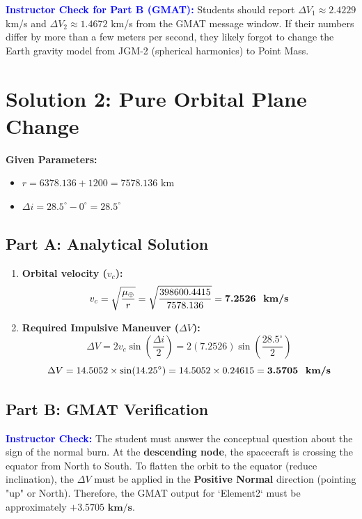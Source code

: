 \documentclass[12pt]{article}
\begin{document}
\textcolor{blue}{\textbf{Instructor Check for Part B (GMAT):}} Students should report $\Delta V_1 \approx 2.4229$ km/s and $\Delta V_2 \approx 1.4672$ km/s from the GMAT message window. If their numbers differ by more than a few meters per second, they likely forgot to change the Earth gravity model from JGM-2 (spherical harmonics) to Point Mass.

\newpage

\section*{Solution 2: Pure Orbital Plane Change}

\textbf{Given Parameters:}
\begin{itemize}
    \item $r = 6378.136 + 1200 = 7578.136 \text{ km}$
    \item $\Delta i = 28.5^\circ - 0^\circ = 28.5^\circ$
\end{itemize}

\subsection*{Part A: Analytical Solution}
\begin{enumerate}
    \item \textbf{Orbital velocity ($v_c$):}
    \begin{equation*}
        v_c = \sqrt{\frac{\mu_{\oplus}}{r}} = \sqrt{\frac{398600.4415}{7578.136}} = \textbf{7.2526 \text{ km/s}}
    \end{equation*}

    \item \textbf{Required Impulsive Maneuver ($\Delta V$):}
    \begin{equation*}
        \Delta V = 2 v_c \sin \left( \frac{\Delta i}{2} \right) = 2 (7.2526) \sin \left( \frac{28.5^\circ}{2} \right) 
    \end{equation*}
    \begin{equation*}
        \Delta V = 14.5052 \times \sin(14.25^\circ) = 14.5052 \times 0.24615 = \textbf{3.5705 \text{ km/s}}
    \end{equation*}
\end{enumerate}

\subsection*{Part B: GMAT Verification}
\textcolor{blue}{\textbf{Instructor Check:}} The student must answer the conceptual question about the sign of the normal burn. At the \textbf{descending node}, the spacecraft is crossing the equator from North to South. To flatten the orbit to the equator (reduce inclination), the $\Delta V$ must be applied in the \textbf{Positive Normal} direction (pointing "up" or North). Therefore, the GMAT output for `Element2` must be approximately $\mathbf{+3.5705 \text{ km/s}}$.
\end{document}
